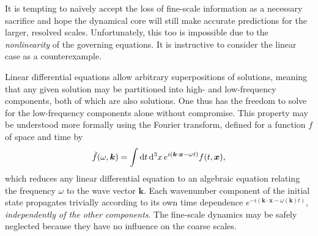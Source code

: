 \documentclass[titlepage,twoside]{article}
\numberwithin{equation}{section}
\renewcommand{\d}[1]{\mathrm{d}#1}
\renewcommand\vec{\bm}
\begin{document}
It is tempting to na\"{i}vely accept the loss of fine-scale information as a
necessary sacrifice and hope the dynamical core will still make accurate
predictions for the larger, resolved scales. Unfortunately, this too is
impossible due to the \emph{nonlinearity} of the governing equations. It is
instructive to consider the linear case as a counterexample.

Linear differential equations allow arbitrary superpositions of solutions,
meaning that any given solution may be partitioned into high- and low-frequency
components, both of which are also solutions. One thus has the freedom to solve
for the low-frequency components alone without compromise. This property may be
understood more formally using the Fourier transform, defined for a function
$f$ of space and time by
\[
    \tilde{f}(\omega, \vec{k})
        = \int \d{t}\,\d^3{x}\, e^{i(\vec{k} \cdot \vec{x} - \omega t)}
        f(t, \vec{x}),
\]
which reduces any linear differential equation to an algebraic equation
relating the frequency $\omega$ to the wave vector $\vec{k}$. Each wavenumber
component of the initial state propagates trivially according to its own
time dependence $e^{-i(\vec{k} \cdot \vec{x} - \omega(\vec{k}) t)}$,
\emph{independently of the other components}. The fine-scale dynamics may
be safely neglected because they have no influence on the coarse scales.
\end{document}
